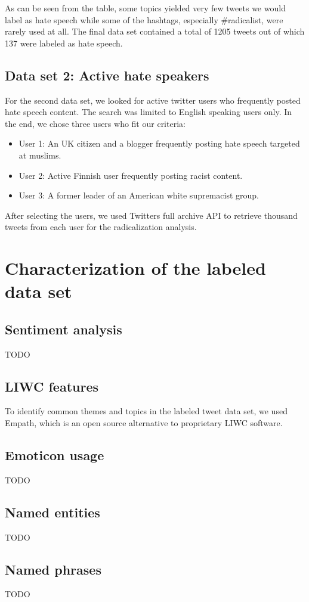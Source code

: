 \documentclass[conference]{IEEEtran}
\begin{document}
As can be seen from the table, some topics yielded very few tweets we would label as hate speech 
while some of the hashtags, especially \#radicalist, were rarely used at all. The final 
data set contained a total of 1205 tweets out of which 137 were labeled as hate speech.

\subsection{Data set 2: Active hate speakers}
For the second data set, we looked for active twitter users who frequently posted hate speech content. 
The search was limited to English speaking users only. In the end, we chose three users who fit our 
criteria: 
\begin{itemize}
    \item User 1: An UK citizen and a blogger frequently posting hate speech targeted at muslims.
    \item User 2: Active Finnish user frequently posting racist content.
    \item User 3: A former leader of an American white supremacist group.
\end{itemize}
After selecting the users, we used Twitters full archive API to retrieve thousand tweets from each user for the
radicalization analysis. 
\section{Characterization of the labeled data set}
\subsection{Sentiment analysis}
TODO
\subsection{LIWC features}
To identify common themes and topics in the labeled tweet data set, we 
used Empath, which is an open source alternative to proprietary LIWC software. \cite{fast2016empath}

\subsection{Emoticon usage}
TODO
\subsection{Named entities}
TODO
\subsection{Named phrases}
TODO
\end{document}
